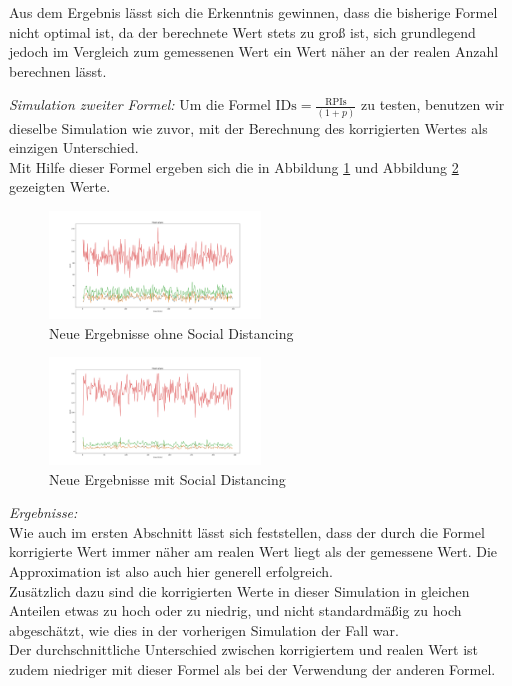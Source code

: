 \documentclass[conference]{IEEEtran}
\begin{document}
Aus dem Ergebnis lässt sich die Erkenntnis gewinnen, dass die bisherige Formel nicht optimal ist, da der berechnete Wert stets zu groß ist, sich grundlegend jedoch im Vergleich zum gemessenen Wert ein Wert näher an der realen Anzahl berechnen lässt.

\textit{Simulation zweiter Formel:}
Um die Formel $\text{IDs} = \frac{\text{RPIs}}{(1+p)}$
zu testen, benutzen wir dieselbe Simulation wie zuvor, mit der Berechnung des korrigierten Wertes als einzigen Unterschied.\\
Mit Hilfe dieser Formel ergeben sich die in Abbildung \ref{mast_data_plotted} und Abbildung \ref{mast_data_plotted_social_distancing} gezeigten Werte.

\begin{figure}[h]
	\centering
	\includegraphics[width=0.5\textwidth]{"Mast_Data_Plotted"}
	\caption{Neue Ergebnisse ohne Social Distancing}
	\label{mast_data_plotted}
\end{figure}

\begin{figure}[h]
	\centering
	\includegraphics[width=0.5\textwidth]{"Mast_Data_Plotted_Social_Distancing"}
	\caption{Neue Ergebnisse mit Social Distancing}
	\label{mast_data_plotted_social_distancing}
\end{figure}

\textit{Ergebnisse:}\\
Wie auch im ersten Abschnitt lässt sich feststellen, dass der durch die Formel korrigierte Wert immer näher am realen Wert liegt als der gemessene Wert. Die Approximation ist also auch hier generell erfolgreich.\\
Zusätzlich dazu sind die korrigierten Werte in dieser Simulation in gleichen Anteilen etwas zu hoch oder zu niedrig, und nicht standardmäßig zu hoch abgeschätzt, wie dies in der vorherigen Simulation der Fall war.\\
Der durchschnittliche Unterschied zwischen korrigiertem und realen Wert ist zudem niedriger mit dieser Formel als bei der Verwendung der anderen Formel.\\
\end{document}
